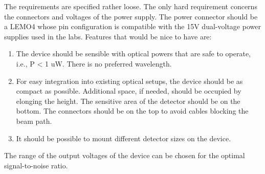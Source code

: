 The requirements are specified rather loose. The only hard requirement concerns the connectors and voltages of the power supply. The power connector should be a LEMO4 whose pin configuration is compatible with the 15V dual-voltage power supplies used in the labs. Features that would be nice to have are:
\begin{enumerate}
	\item The device should be sensible with optical powers that are safe to operate, i.e., P < 1 uW. There is no preferred wavelength.
	\item For easy integration into existing optical setups, the device should be as compact as possible. Additional space, if needed, should be occupied by elonging the height. The sensitive area of the detector should be on the bottom. The connectors should be on the top to avoid cables blocking the beam path.
	\item It should be possible to mount different detector sizes on the device.
\end{enumerate}
The range of the output voltages of the device can be chosen for the optimal signal-to-noise ratio.


